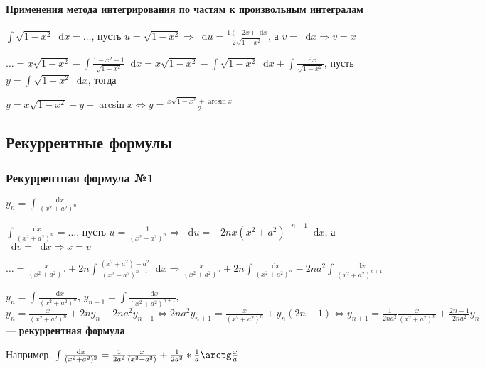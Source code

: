 \documentclass{article}
\newcommand*\diff{\mathop{}\!\mathrm{d}}
\begin{document}
\paragraph{Применения метода интегрирования по частям к произвольным интегралам}

$\int \sqrt{1 - x^2} \diff x = \dots$, пусть $u = \sqrt{1 - x^2} \Longrightarrow \diff u = \frac{1(-2x) \diff x}{2\sqrt{1 - x^2}}$, а $v = \diff x \Longrightarrow v = x$

$\dots = x \sqrt{1 - x^2} - \int \frac{1 - x^2 - 1}{\sqrt{1 - x^2}} \diff x = x \sqrt{1 - x^2} - \int \sqrt{1 - x^2} \diff x + \int \frac{\diff x}{\sqrt{1 - x^2}}$, пусть $y = \int \sqrt{1 - x^2} \diff x$, тогда

$y = x \sqrt{1 - x^2} - y + \arcsin x \Longleftrightarrow y = \frac{x \sqrt{1 - x^2} + \arcsin x}{2}$

\subsection{Рекуррентные формулы}

\subsubsection{Рекуррентная формула №1}

$y_{n} = \int \frac{\diff x}{(x^2 + a^2)^{n}}$

\hfill

$\int \frac{\diff x}{(x^2 + a^2)^{n}} = \dots$, пусть $u = \frac{1}{(x^2 + a^2)^{n}} \Longrightarrow \diff u = - 2 n x (x^2 + a^2)^{-n - 1} \diff x$, а $\diff v = \diff x \Longrightarrow x = v$

$\dots = \frac{x}{(x^2 + a^2)^{n}} + 2 n \int \frac{(x^2 + a^{2}) - a^{2}}{(x^2 + a^2)^{n + 1}} \diff x \Longrightarrow \frac{x}{(x^2 + a^2)^{n}} + 2 n \int \frac{\diff x}{(x^2 + a^2)^{n}} - 2 n a^2 \int \frac{\diff x}{(x^2 + a^2)^{n + 1}}$

\hfill 

$y_n = \int \frac{\diff x}{(x^2 + a^2)^{n}}$, $y_{n + 1} = \int \frac{\diff x}{(x^2 + a^2)^{n + 1}}$, $y_n = \frac{x}{(x^2 + a^2)^{n}} + 2 n y_n - 2 n a ^2 y_{n + 1} \Longleftrightarrow 2 n a^2 y_{n + 1} = \frac{x}{(x^2 + a^2)^{n}} + y_n (2 n - 1) \Longleftrightarrow y_{n + 1} = \frac{1}{2 n a^2} \frac{x}{(x^2 + a^2)^{n}} + \frac{2 n - 1}{2 n a^2} y_n$ — \textbf{рекуррентная формула}

\hfill

Например, $\int \frac{\diff x}{(x^2 + a^2)^{2}} = \frac{1}{2 a^2} \frac{x}{(x^2 + a^2)} + \frac{1}{2a^2} * \frac{1}{a} \arctg \frac{x}{a}$
\end{document}
